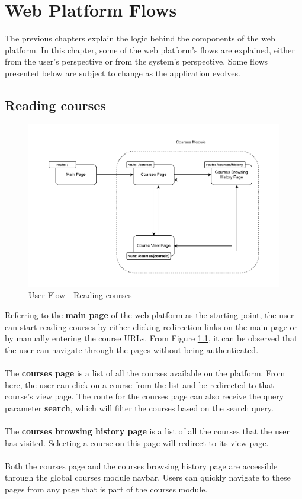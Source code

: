 \chapter{Web Platform Flows}

The previous chapters explain the logic behind the components of the web platform. In this chapter, some of the web platform's flows are explained, either from the user's perspective or from the system's perspective. Some flows presented below are subject to change as the application evolves.

\section{Reading courses}

\begin{figure}[h]
    \centering
    \includegraphics{images/course-reading-flow.pdf}
    \caption{User Flow - Reading courses}
    \label{fig:course-reading-flow}
\end{figure}

\newpage
\noindent Referring to the \textbf{main page} of the web platform as the starting point, the user can start reading courses by either clicking redirection links on the main page or by manually entering the course URLs. From Figure \ref{fig:course-reading-flow}, it can be observed that the user can navigate through the pages without being authenticated.
\\\\
\noindent The \textbf{courses page} is a list of all the courses available on the platform. From here, the user can click on a course from the list and be redirected to that course's view page. The route for the courses page can also receive the query parameter \textbf{search}, which will filter the courses based on the search query.
\\\\
\noindent The \textbf{courses browsing history page} is a list of all the courses that the user has visited. Selecting a course on this page will redirect to its view page.
\\\\
\noindent Both the courses page and the courses browsing history page are accessible through the global courses module navbar. Users can quickly navigate to these pages from any page that is part of the courses module.

